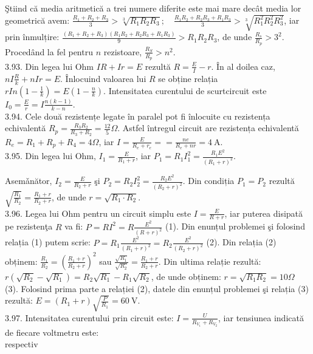 Ştiind că media aritmetică a trei numere diferite este mai mare decât media lor geometrică avem: $\frac{R_{1}+R_{2}+R_{3}}{3}>\sqrt[3]{R_{1} R_{2} R_{3}} ; \quad \frac{R_{1} R_{2}+R_{2} R_{3}+R_{1} R_{3}}{3}>\sqrt[3]{R_{1}^{2} R_{2}^{2} R_{3}^{2}}$, iar prin înmulțire: $\frac{\left(R_{1}+R_{2}+R_{3}\right)\left(R_{1} R_{2}+R_{2} R_{3}+R_{1} R_{3}\right)}{9}>R_{1} R_{2} R_{3}$, de unde $\frac{R_{s}}{R_{p}}>3^{2}$. Procedând la fel pentru $n$ rezistoare, $\frac{R_{S}}{R_{p}}>n^{2}$.\\
3.93. Din legea lui Ohm $I R+I r=E$ rezultă $R=\frac{E}{I}-r$. În al doilea caz, $n I \frac{R}{k}+n I r=E$. Înlocuind valoarea lui $R$ se obține relația $r I n\left(1-\frac{1}{k}\right)=E\left(1-\frac{n}{k}\right)$. Intensitatea curentului de scurtcircuit este $I_{0}=\frac{E}{r}=I \frac{n(k-1)}{k-n}$.\\
3.94. Cele două rezistențe legate în paralel pot fi înlocuite cu rezistența echivalentă $R_{p}=\frac{R_{3} R_{2}}{R_{3}+R_{2}}=\frac{12}{5} \Omega$. Astfel întregul circuit are rezistența echivalentă $R_{e}=R_{1}+R_{p}+R_{4}=4 \Omega$, iar $I=\frac{E}{R_{e}+r_{e}}==\frac{n e}{R_{e}+n r}=4 \mathrm{~A}$.\\
3.95. Din legea lui Ohm, $I_{1}=\frac{E}{R_{1}+r}$, iar $P_{1}=R_{1} I_{1}^{2}=\frac{R_{1} E^{2}}{\left(R_{1}+r\right)^{2}}$.

Asemǎnător, $I_{2}=\frac{E}{R_{2}+r}$ şi $P_{2}=R_{2} I_{2}^{2}=\frac{R_{2} E^{2}}{\left(R_{2}+r\right)^{2}}$. Din condiția $P_{1}=P_{2}$ rezultă $\sqrt{\frac{R_{1}}{R_{2}}}=\frac{R_{1}+r}{R_{2}+r}$, de unde $r=\sqrt{R_{1} \cdot R_{2}}$.\\
3.96. Legea lui Ohm pentru un circuit simplu este $I=\frac{E}{R+r}$, iar puterea disipată pe rezistenţa $R$ va fi: $P=R I^{2}=R \frac{E^{2}}{(R+r)^{2}}$ (1). Din enunțul problemei şi folosind relația (1) putem scrie: $P=R_{1} \frac{E^{2}}{\left(R_{1}+r\right)^{2}}=R_{2} \frac{E^{2}}{\left(R_{2}+r\right)^{2}}$ (2). Din relația (2) obținem: $\frac{R_{1}}{R_{2}}=\left(\frac{R_{1}+r}{R_{2}+r}\right)^{2}$ sau $\frac{\sqrt{R_{1}}}{\sqrt{R_{2}}}=\frac{R_{1}+r}{R_{2}+r}$. Din ultima relație rezultă: $r\left(\sqrt{R_{2}}-\sqrt{R_{1}}\right)=R_{2} \sqrt{R_{1}}-R_{1} \sqrt{R_{2}}$, de unde obținem: $r=\sqrt{R_{1} R_{2}}=10 \Omega \quad$ (3). Folosind prima parte a relației (2), datele din enunțul problemei şi relația (3) rezultă: $E=\left(R_{1}+r\right) \sqrt{\frac{P}{R_{1}}}=60 \mathrm{~V}$.\\
3.97. Intensitatea curentului prin circuit este: $I=\frac{U}{R_{V_{1}}+R_{V_{2}}}$, iar tensiunea indicată de fiecare voltmetru este:\\
respectiv

